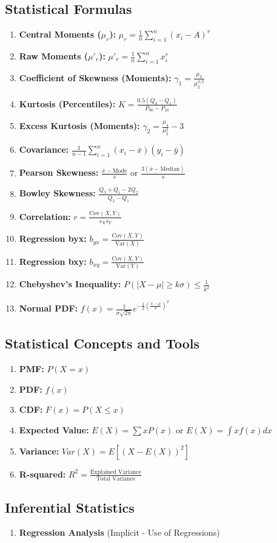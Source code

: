 \documentclass{article}
\begin{document}
\subsection*{Statistical Formulas}
\begin{enumerate}
  \item \textbf{Central Moments ($\mu_r$):} $\mu_r = \frac{1}{n} \sum_{i=1}^{n} (x_i - A)^r$
  \item \textbf{Raw Moments ($\mu'_r$):} $\mu'_r = \frac{1}{n} \sum_{i=1}^{n} x_i^r$
   \item \textbf{Coefficient of Skewness (Moments):} $\gamma_1 = \frac{\mu_3}{\mu_2^{3/2}}$
    \item \textbf{Kurtosis (Percentiles):} $K = \frac{0.5(Q_3 - Q_1)}{P_{90} - P_{10}}$
   \item \textbf{Excess Kurtosis (Moments):} $\gamma_2 = \frac{\mu_4}{\mu_2^2} - 3$
     \item \textbf{Covariance:} $\frac{1}{n-1} \sum_{i=1}^{n} (x_i - \bar{x})(y_i - \bar{y})$
    \item \textbf{Pearson Skewness:} $\frac{\bar{x} - \text{Mode}}{s}$ or $\frac{3(\bar{x} - \text{Median})}{s}$
    \item \textbf{Bowley Skewness:} $\frac{Q_3 + Q_1 - 2Q_2}{Q_3 - Q_1}$
    \item \textbf{Correlation:} $r = \frac{\text{Cov}(X, Y)}{s_X s_Y}$
    \item \textbf{Regression byx:} $b_{yx} = \frac{\text{Cov}(X,Y)}{\text{Var}(X)}$
    \item \textbf{Regression bxy:} $b_{xy} = \frac{\text{Cov}(X,Y)}{\text{Var}(Y)}$
       \item \textbf{Chebyshev's Inequality:} $P(|X-\mu| \geq k\sigma) \leq \frac{1}{k^2}$
    \item \textbf{Normal PDF:} $f(x) = \frac{1}{\sigma \sqrt{2\pi}} e^{-\frac{1}{2}(\frac{x - \mu}{\sigma})^2}$
\end{enumerate}

\subsection*{Statistical Concepts and Tools}
\begin{enumerate}
    \item \textbf{PMF:} $P(X = x)$
    \item \textbf{PDF:} $f(x)$
    \item \textbf{CDF:} $F(x) = P(X \leq x)$
    \item \textbf{Expected Value:} $E(X) = \sum xP(x)$ or $E(X) = \int xf(x)dx$
    \item \textbf{Variance:} $Var(X) = E[(X - E(X))^2]$
      \item  \textbf{R-squared:} $R^2 = \frac{\text{Explained Variance}}{\text{Total Variance}}$
  \end{enumerate}


\subsection*{Inferential Statistics}
\begin{enumerate}
    \item  \textbf{Regression Analysis} (Implicit - Use of Regressions)
\end{enumerate}
\end{document}
